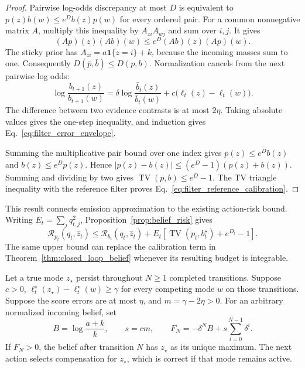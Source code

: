 \begin{proof}
Pairwise log-odds discrepancy at most $D$ is equivalent to
$p(z)b(w)\le e^D b(z)p(w)$ for every ordered pair.
For a common nonnegative matrix $A$, multiply this inequality by $A_{zi}A_{wj}$ and sum over $i,j$.
It gives
\begin{equation}
 (Ap)(z)(Ab)(w)\le e^D(Ab)(z)(Ap)(w).
\end{equation}
The sticky prior has $A_{zi}=a\mathbf1\{z=i\}+k$, because the incoming masses sum to one.
Consequently $D(\bar p,\bar b)\le D(p,b)$.
Normalization cancels from the next pairwise log odds:
\begin{equation}
 \log\frac{b_{t+1}(z)}{b_{t+1}(w)}
 =\delta\log\frac{\bar b_t(z)}{\bar b_t(w)}
   +c\bigl(\ell_t(z)-\ell_t(w)\bigr).
 \label{eq:filter_exact_odds}
\end{equation}
The difference between two evidence contrasts is at most $2\eta$.
Taking absolute values gives the one-step inequality, and induction gives Eq.~\eqref{eq:filter_error_envelope}.

Summing the multiplicative pair bound over one index gives
$p(z)\le e^D b(z)$ and $b(z)\le e^D p(z)$.
Hence $|p(z)-b(z)|\le(e^D-1)(p(z)+b(z))$.
Summing and dividing by two gives $\operatorname{TV}(p,b)\le e^D-1$.
The TV triangle inequality with the reference filter proves Eq.~\eqref{eq:filter_reference_calibration}.
\end{proof}

This result connects emission approximation to the existing action-risk bound.
Writing $E_t=\sum_jq_{t,j}^2$, Proposition~\ref{prop:belief_risk} gives
\begin{equation}
 \mathcal R_{p_t}(q_t,\hat z_t)
 \le\mathcal R_{b_t}(q_t,\hat z_t)
 +E_t\left[\operatorname{TV}(p_t,b_t^\star)+e^{D_t}-1\right].
 \label{eq:filter_to_action_risk}
\end{equation}
The same upper bound can replace the calibration term in Theorem~\ref{thm:closed_loop_belief} whenever its resulting budget is integrable.

\begin{proposition}
\label{prop:filter_recovery}
Let a true mode $z_\star$ persist throughout $N\ge1$ completed transitions.
Suppose $c>0$, $\ell_t^\star(z_\star)-\ell_t^\star(w)\ge\gamma$ for every competing mode $w$ on those transitions.
Suppose the score errors are at most $\eta$, and $m=\gamma-2\eta>0$.
For an arbitrary normalized incoming belief, set
\begin{equation}
 B=\log\frac{a+k}{k},\qquad s=cm,\qquad
 F_N=-\delta^NB+s\sum_{i=0}^{N-1}\delta^i.
 \label{eq:filter_recovery_certificate}
\end{equation}
If $F_N>0$, the belief after transition $N$ has $z_\star$ as its unique maximum.
The next action selects compensation for $z_\star$, which is correct if that mode remains active.
\end{proposition}

